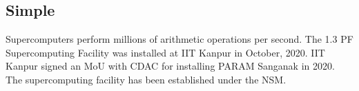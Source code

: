 \subsection{Simple}

Supercomputers perform millions of arithmetic operations per second. 
The 1.3 PF Supercomputing Facility was installed at IIT Kanpur in October, 2020.
IIT Kanpur signed an MoU with CDAC for installing PARAM Sanganak in 2020.
The supercomputing facility has been established under the NSM.